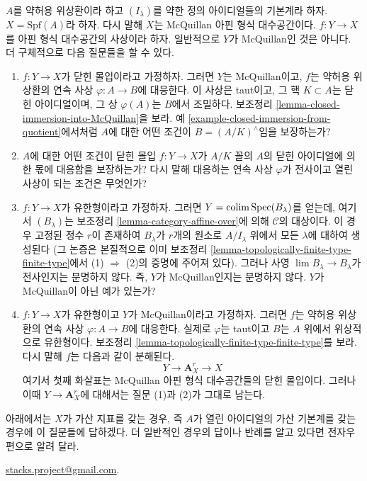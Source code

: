 \begin{remark}
\label{remark-questions}
$A$를 약허용 위상환이라 하고 $(I_\lambda)$를 약한 정의 아이디얼들의
기본계라 하자. $X = \text{Spf}(A)$라 하자. 다시 말해 $X$는
McQuillan 아핀 형식 대수공간이다. $f : Y \to X$를 아핀 형식
대수공간의 사상이라 하자. 일반적으로 $Y$가 McQuillan인 것은 아니다.
더 구체적으로 다음 질문들을 할 수 있다.
\begin{enumerate}
\item $f : Y \to X$가 닫힌 몰입이라고 가정하자. 그러면 $Y$는
McQuillan이고, $f$는 약허용 위상환의 연속 사상
$\varphi : A \to B$에 대응한다. 이 사상은 taut이고, 그 핵
$K \subset A$는 닫힌 아이디얼이며, 그 상 $\varphi(A)$는 $B$에서
조밀하다. 보조정리 \ref{lemma-closed-immersion-into-McQuillan}을 보라.
예 \ref{example-closed-immersion-from-quotient}에서처럼 $A$에 대한
어떤 조건이 $B = (A/K)^\wedge$임을 보장하는가?
\item $A$에 대한 어떤 조건이 닫힌 몰입 $f : Y \to X$가
$A/K$ 꼴의 $A$의 닫힌 아이디얼에 의한 몫에 대응함을 보장하는가? 다시 말해
대응하는 연속 사상 $\varphi$가 전사이고 열린 사상이 되는 조건은 무엇인가?
\item $f : Y \to X$가 유한형이라고 가정하자. 그러면
$Y = \mathop{\mathrm{colim}}\nolimits \mathop{\mathrm{Spec}}(B_\lambda)$를 얻는데, 여기서 $(B_\lambda)$는
보조정리 \ref{lemma-category-affine-over}에 의해 $\mathcal{C}$의 대상이다.
이 경우 고정된 정수 $r$이 존재하여 $B_\lambda$가 $r$개의 원소로
$A/I_\lambda$ 위에서 모든 $\lambda$에 대하여 생성된다
(그 논증은 본질적으로 이미 보조정리
\ref{lemma-topologically-finite-type-finite-type}에서
(1) $\Rightarrow$ (2)의 증명에 주어져 있다). 그러나 사영
$\lim B_\lambda \to B_\lambda$가 전사인지는 분명하지 않다. 즉,
$Y$가 McQuillan인지는 분명하지 않다. $Y$가 McQuillan이 아닌 예가 있는가?
\item $f : Y \to X$가 유한형이고 $Y$가 McQuillan이라고 가정하자.
그러면 $f$는 약허용 위상환의 연속 사상 $\varphi : A \to B$에
대응한다. 실제로 $\varphi$는 taut이고 $B$는 $A$ 위에서 위상적으로
유한형이다. 보조정리
\ref{lemma-topologically-finite-type-finite-type}를 보라. 다시 말해
$f$는 다음과 같이 분해된다.
$$
Y \longrightarrow \mathbf{A}^r_X \longrightarrow X
$$
여기서 첫째 화살표는 McQuillan 아핀 형식 대수공간들의 닫힌 몰입이다.
그러나 이때 $Y \to \mathbf{A}^r_X$에 대해서는 질문 (1)과 (2)가
그대로 남는다.
\end{enumerate}
아래에서는 $X$가 가산 지표를 갖는 경우, 즉 $A$가 열린 아이디얼의
가산 기본계를 갖는 경우에 이 질문들에 답하겠다. 더 일반적인 경우의
답이나 반례를 알고 있다면 전자우편으로 알려 달라. %
\par\noindent
\href{mailto:stacks.project@gmail.com}{stacks.project@gmail.com}.
\end{remark}

